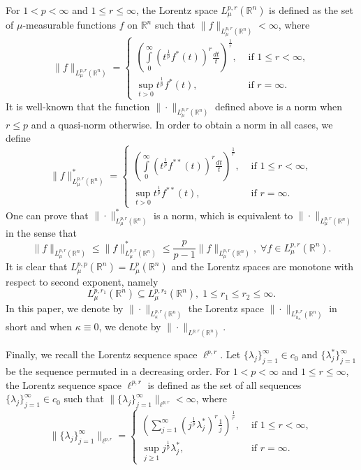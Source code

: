 \documentclass[a4paper,11pt, reqno]{amsart}
\numberwithin{equation}{section}
\theoremstyle{plain}
\theoremstyle{definition}
\theoremstyle{remark}
\begin{document}
For $1<p<\infty$ and $1\leq r\leq \infty$, the Lorentz space $L^{p,r}_\mu(\mathbb{R}^n)$ is defined as the set of $\mu$-measurable functions $f$ on $\mathbb{R}^n$ such that $\|f\|_{L^{p,r}_\mu(\mathbb{R}^n)}<\infty$, where
\begin{equation*}
\|f\|_{L^{p,r}_\mu(\mathbb{R}^n)}=
\begin{cases}
\left(\int\limits_0^\infty (t^\frac{1}{p}f^*(t))^r\frac{dt}{t}\right)^\frac{1}{r},&\text{ if } 1\leq r<\infty,\\
\sup\limits_{t>0}t^\frac{1}{p}f^*(t),&\text{ if } r=\infty.
\end{cases}
\end{equation*}
It is well-known that the function $\|\cdot\|_{L^{p,r}_\mu(\mathbb{R}^n)}$ defined above is a norm when $r\leq p$ and a quasi-norm otherwise. In order to obtain a norm in all cases, we define
\begin{equation*}
    \|f\|^*_{L^{p,r}_\mu(\mathbb{R}^n)}=
\begin{cases}
\left(\int\limits_0^\infty (t^\frac{1}{p}f^{**}(t))^r\frac{dt}{t}\right)^\frac{1}{r},&\text{ if } 1\leq r<\infty,\\
\sup\limits_{t>0}t^\frac{1}{p}f^{**}(t),&\text{ if } r=\infty.
\end{cases}
\end{equation*}
One can prove that   $\|\cdot\|^*_{L^{p,r}_\mu(\mathbb{R}^n)}$ is a norm, which is equivalent to $\|\cdot\|_{L^{p,r}_\mu(\mathbb{R}^n)}$ in the sense that
\begin{equation*}
\|f\|_{L^{p,r}_\mu(\mathbb{R}^n)}\leq\|f\|^*_{L^{p,r}_\mu(\mathbb{R}^n)}\leq \frac{p}{p-1}\|f\|_{L^{p,r}_\mu(\mathbb{R}^n)}, \;\forall f\in L^{p,r}_\mu(\mathbb{R}^n).
\end{equation*}
It is clear that $L^{p,p}_\mu(\mathbb{R}^n)=L^p_\mu(\mathbb{R}^n)$ and the Lorentz spaces are monotone with respect to second exponent, namely
\begin{equation}\label{embedding}
    L^{p,r_1}_\mu(\mathbb{R}^n)\subseteq L^{p,r_2}_\mu(\mathbb{R}^n),\;1\leq r_1\leq r_2\leq \infty.
\end{equation}
In this paper, we denote by $\|\cdot\|_{L^{p,r}_\kappa(\mathbb{R}^n)}$ the Lorentz space $\|\cdot\|_{L^{p,r}_{h_\kappa}(\mathbb{R}^n)}$ in short and when $\kappa\equiv 0$, we denote by $\|\cdot\|_{L^{p,r}(\mathbb{R}^n)}$.

Finally, we recall the Lorentz sequence space $\ell^{p,r}$. Let $\{\lambda_j\}^\infty_{j=1}\in c_0$ and $\{\lambda^*_j\}^\infty_{j=1}$ be the sequence permuted in a decreasing order. For $1<p<\infty$ and $1\leq r\leq \infty$, the Lorentz sequence space $\ell^{p,r}$ is defined as the set of all sequences $\{\lambda_j\}^\infty_{j=1}\in c_0$ such that $\|\{\lambda_j\}^\infty_{j=1}\|_{\ell^{p,r}}<\infty$, where
\begin{equation*}
\|\{\lambda_j\}^\infty_{j=1}\|_{\ell^{p,r}}=
\begin{cases}
\left(\sum\limits_{j=1}^\infty (j^\frac{1}{p}\lambda_j^*)^r\frac{1}{j}\right)^\frac{1}{r},&\text{ if } 1\leq r<\infty,\\
\sup\limits_{j\geq1}j^\frac{1}{p}\lambda_j^*,&\text{ if } r=\infty.
\end{cases}
\end{equation*}
\end{document}
